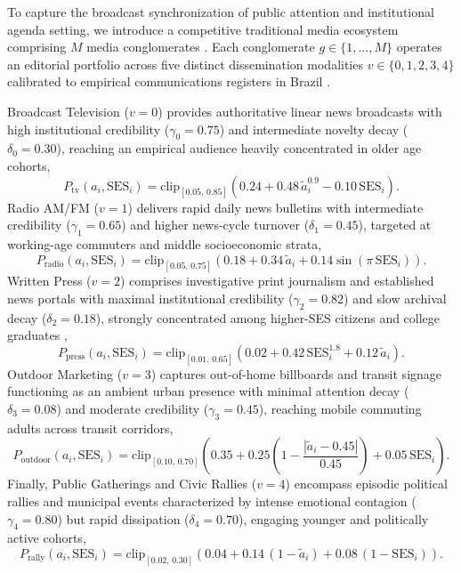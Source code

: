 \documentclass{article}
\begin{document}
To capture the broadcast synchronization of public attention and institutional agenda setting, we introduce a competitive traditional media ecosystem comprising $M$ media conglomerates \citep{mullainathan2005market, gentzkow2006media, mccombs1972agenda}. Each conglomerate $g \in \{1, \dots, M\}$ operates an editorial portfolio across five distinct dissemination modalities $v \in \{0, 1, 2, 3, 4\}$ calibrated to empirical communications registers in Brazil \citep{kantar2023inside, reuters2023digital}.

Broadcast Television ($v = 0$) provides authoritative linear news broadcasts with high institutional credibility ($\gamma_0 = 0.75$) and intermediate novelty decay ($\delta_0 = 0.30$), reaching an empirical audience heavily concentrated in older age cohorts,
\begin{equation}
    P_{\mathrm{tv}}(a_i, \mathrm{SES}_i) = \mathrm{clip}_{[0.05,\, 0.85]}\!\left(0.24 + 0.48\,\tilde{a}_i^{0.9} - 0.10\,\mathrm{SES}_i\right).
    \label{eq:reach_tv}
\end{equation}
Radio AM/FM ($v = 1$) delivers rapid daily news bulletins with intermediate credibility ($\gamma_1 = 0.65$) and higher news-cycle turnover ($\delta_1 = 0.45$), targeted at working-age commuters and middle socioeconomic strata,
\begin{equation}
    P_{\mathrm{radio}}(a_i, \mathrm{SES}_i) = \mathrm{clip}_{[0.05,\, 0.75]}\!\left(0.18 + 0.34\,\tilde{a}_i + 0.14\sin(\pi\,\mathrm{SES}_i)\right).
    \label{eq:reach_radio}
\end{equation}
Written Press ($v = 2$) comprises investigative print journalism and established news portals with maximal institutional credibility ($\gamma_2 = 0.82$) and slow archival decay ($\delta_2 = 0.18$), strongly concentrated among higher-SES citizens and college graduates \citep{reuters2023digital},
\begin{equation}
    P_{\mathrm{press}}(a_i, \mathrm{SES}_i) = \mathrm{clip}_{[0.01,\, 0.65]}\!\left(0.02 + 0.42\,\mathrm{SES}_i^{1.8} + 0.12\,\tilde{a}_i\right).
    \label{eq:reach_press}
\end{equation}
Outdoor Marketing ($v = 3$) captures out-of-home billboards and transit signage functioning as an ambient urban presence with minimal attention decay ($\delta_3 = 0.08$) and moderate credibility ($\gamma_3 = 0.45$), reaching mobile commuting adults across transit corridors,
\begin{equation}
    P_{\mathrm{outdoor}}(a_i, \mathrm{SES}_i) = \mathrm{clip}_{[0.10,\, 0.70]}\!\left(0.35 + 0.25\left(1 - \frac{|\tilde{a}_i - 0.45|}{0.45}\right) + 0.05\,\mathrm{SES}_i\right).
    \label{eq:reach_outdoor}
\end{equation}
Finally, Public Gatherings and Civic Rallies ($v = 4$) encompass episodic political rallies and municipal events characterized by intense emotional contagion ($\gamma_4 = 0.80$) but rapid dissipation ($\delta_4 = 0.70$), engaging younger and politically active cohorts,
\begin{equation}
    P_{\mathrm{rally}}(a_i, \mathrm{SES}_i) = \mathrm{clip}_{[0.02,\, 0.30]}\!\left(0.04 + 0.14\,(1 - \tilde{a}_i) + 0.08\,(1 - \mathrm{SES}_i)\right).
    \label{eq:reach_rally}
\end{equation}
\end{document}
